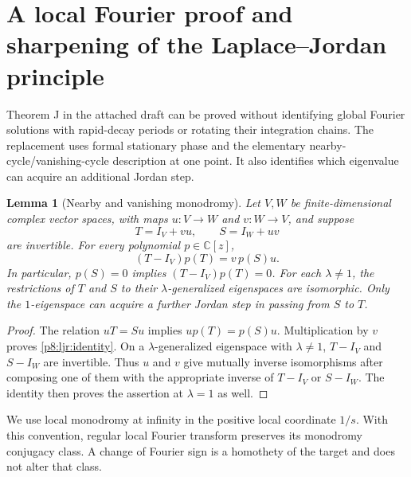 \documentclass[11pt,a4paper]{article}
\newtheorem{lemma}[theorem]{Lemma}
\theoremstyle{definition}
\theoremstyle{remark}
\numberwithin{equation}{section}
\begin{document}
\clearpage

\section{A local Fourier proof and sharpening of the Laplace--Jordan principle}
\label{p8:ljr:sec}

Theorem J in the attached draft can be proved without identifying global
Fourier solutions with rapid-decay periods or rotating their integration
chains.  The replacement uses formal stationary phase and the elementary
nearby-cycle/vanishing-cycle description at one point.  It also identifies
which eigenvalue can acquire an additional Jordan step.

\begin{lemma}[Nearby and vanishing monodromy]\label{p8:ljr:quiver}
Let $V,W$ be finite-dimensional complex vector spaces, with maps
$u:V\to W$ and $v:W\to V$, and suppose
\[
                 T=I_V+vu,\qquad S=I_W+uv
\]
are invertible. For every polynomial $p\in\mathbb C[z]$,
\begin{equation}\label{p8:ljr:identity}
                    (T-I_V)p(T)=v\,p(S)u.
\end{equation}
In particular, $p(S)=0$ implies $(T-I_V)p(T)=0$.
For each $\lambda\ne1$, the restrictions of $T$ and $S$ to their
$\lambda$-generalized eigenspaces are isomorphic.  Only the
$1$-eigenspace can acquire a further Jordan step in passing from $S$ to $T$.
\end{lemma}
\begin{proof}
The relation $uT=Su$ implies $up(T)=p(S)u$. Multiplication by
$v$ proves \eqref{p8:ljr:identity}.  On a $\lambda$-generalized
eigenspace with $\lambda\ne1$, $T-I_V$ and $S-I_W$ are invertible.
Thus $u$ and $v$ give mutually inverse isomorphisms after composing
one of them with the appropriate inverse of $T-I_V$ or $S-I_W$.
The identity then proves the assertion at $\lambda=1$ as well.
\end{proof}

We use local monodromy at infinity in the positive local coordinate
$1/s$. With this convention, regular local Fourier transform preserves
its monodromy conjugacy class. A change of Fourier sign is a homothety
of the target and does not alter that class.
\end{document}

